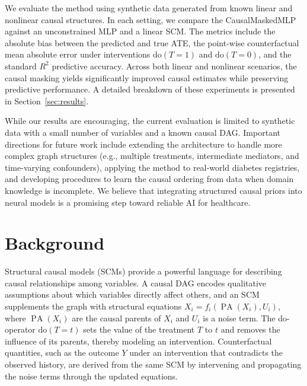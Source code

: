 \documentclass[11pt,a4paper]{article}
\begin{document}
We evaluate the method using synthetic data generated from known linear and nonlinear causal structures. In each setting, we compare the CausalMaskedMLP against an unconstrained MLP and a linear SCM. The metrics include the absolute bias between the predicted and true ATE, the point-wise counterfactual mean absolute error under interventions $\mathrm{do}(T=1)$ and $\mathrm{do}(T=0)$, and the standard $R^2$ predictive accuracy. Across both linear and nonlinear scenarios, the causal masking yields significantly improved causal estimates while preserving predictive performance. A detailed breakdown of these experiments is presented in Section~\ref{sec:results}.

While our results are encouraging, the current evaluation is limited to synthetic data with a small number of variables and a known causal DAG. Important directions for future work include extending the architecture to handle more complex graph structures (e.g., multiple treatments, intermediate mediators, and time-varying confounders), applying the method to real‑world diabetes registries, and developing procedures to learn the causal ordering from data when domain knowledge is incomplete. We believe that integrating structured causal priors into neural models is a promising step toward reliable AI for healthcare.

\section{Background}
\label{sec:background}
Structural causal models (SCMs) provide a powerful language for describing causal relationships among variables. A causal DAG encodes qualitative assumptions about which variables directly affect others, and an SCM supplements the graph with structural equations $X_i = f_i(\operatorname{PA}(X_i), U_i)$, where $\operatorname{PA}(X_i)$ are the causal parents of $X_i$ and $U_i$ is a noise term. The do-operator $\mathrm{do}(T=t)$ sets the value of the treatment $T$ to $t$ and removes the influence of its parents, thereby modeling an intervention. Counterfactual quantities, such as the outcome $Y$ under an intervention that contradicts the observed history, are derived from the same SCM by intervening and propagating the noise terms through the updated equations.
\end{document}
